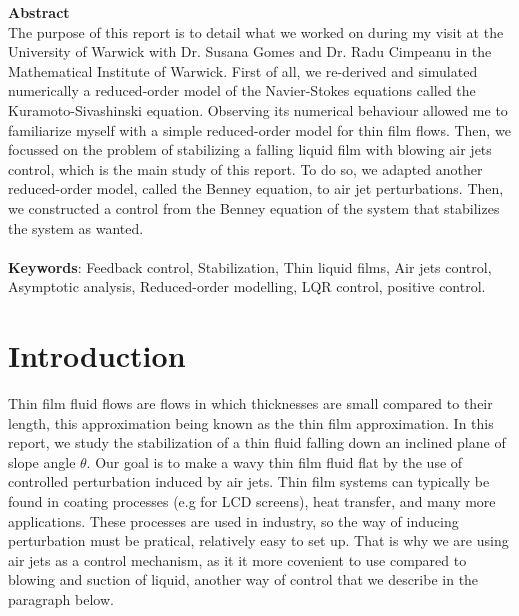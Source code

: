 \documentclass[12pt]{article}
\begin{document}
{\large \textbf{Abstract}} \\
{\normalsize The purpose of this report is to detail what we worked on during my visit at the 
University of Warwick with Dr. Susana Gomes and Dr. Radu Cimpeanu in the Mathematical Institute
 of Warwick. First of all, we re-derived and simulated numerically a reduced-order model of the 
 Navier-Stokes equations called the Kuramoto-Sivashinski equation. Observing its numerical behaviour
  allowed me to familiarize myself with a simple reduced-order model for thin film flows. Then, we 
  focussed on the problem of stabilizing a falling liquid film with blowing air jets control, 
  which is the main study of this report. To do so, we adapted another reduced-order model, called 
  the Benney equation, to air jet perturbations. Then, we constructed a control from the Benney 
  equation of the system that stabilizes the system as wanted.} \\
\vspace{0.8cm} \\
{\large \textbf{Keywords}: \normalsize Feedback control, Stabilization, Thin liquid films, Air jets control, Asymptotic analysis, Reduced-order modelling, LQR control, positive control.}


\newpage
\tableofcontents
\newpage



\section{Introduction}\label{section_intro}
Thin film fluid flows are flows in which thicknesses are small compared to their length, this approximation being known as the
 thin film approximation. In this report, we study the stabilization of a thin fluid falling down an inclined plane of 
 slope angle $\theta$. Our goal is to make a wavy thin film fluid flat by the use of controlled perturbation 
 induced by air jets. Thin film systems can typically be found in coating processes (e.g for LCD screens), heat transfer,
  and many more applications. These processes are used in industry, so the way of inducing perturbation must be pratical, 
  relatively easy to set up. That is why we are using air jets as a control mechanism, as it it more covenient to use compared to
  blowing and suction of liquid, another way of control that we describe in the paragraph below.  \\
\end{document}
